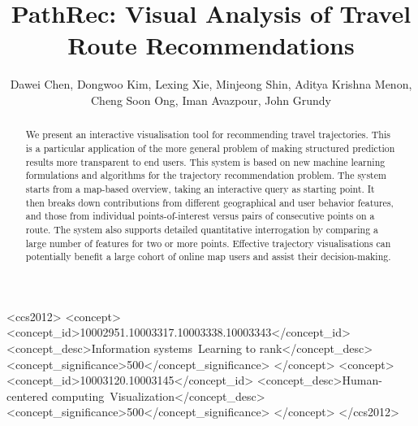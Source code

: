 \documentclass[sigconf]{acmart}
\begin{document}
\title{PathRec: Visual Analysis of Travel Route Recommendations}

\author{Dawei Chen\raisebox{.5ex}{\small*$\dagger$}, Dongwoo Kim\raisebox{.5ex}{\small*}, Lexing Xie\raisebox{.5ex}{\small*$\dagger$},  
        Minjeong Shin\raisebox{.5ex}{\small*}, Aditya Krishna Menon\raisebox{.5ex}{\small$\dagger$*}, \\
        Cheng Soon Ong\raisebox{.5ex}{\small$\dagger$*}, Iman Avazpour\raisebox{.5ex}{\small$\ddagger$}, John Grundy\raisebox{.5ex}{\small$\ddagger$}}


\renewcommand{\shortauthors}{D. Chen et al.}


\begin{abstract}
We present an interactive visualisation tool for recommending travel trajectories. 
This is a particular application of the more general problem of making structured prediction results more transparent to end users. 
This system is based on new machine learning formulations and algorithms for the trajectory recommendation problem. %
The system starts from a map-based overview, taking an interactive query as starting point.  It then breaks down contributions from different geographical and user behavior features, and those from individual points-of-interest versus pairs of consecutive points on a route. The system also supports detailed quantitative interrogation by comparing a large number of features for two or more points. 
Effective trajectory visualisations can potentially benefit a large cohort of online map users and assist their decision-making.  
\end{abstract}

%
%
\begin{CCSXML}
<ccs2012>
<concept>
<concept_id>10002951.10003317.10003338.10003343</concept_id>
<concept_desc>Information systems~Learning to rank</concept_desc>
<concept_significance>500</concept_significance>
</concept>
<concept>
<concept_id>10003120.10003145</concept_id>
<concept_desc>Human-centered computing~Visualization</concept_desc>
<concept_significance>500</concept_significance>
</concept>
</ccs2012>
\end{CCSXML}
\end{document}
